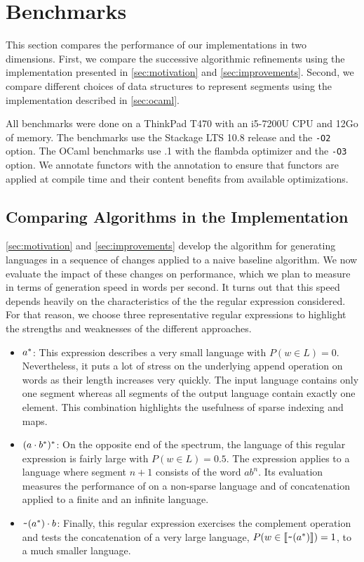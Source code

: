 \section{Benchmarks}
\label{sec:bench}

This section compares the performance of our implementations in two dimensions.
First, we compare the successive algorithmic refinements using the \haskell
implementation presented in \cref{sec:motivation} and \cref{sec:improvements}.
Second, we compare different choices of data structures to represent segments
using the \ocaml implementation described in \cref{sec:ocaml}.

All benchmarks were done on a ThinkPad T470 with an i5-7200U CPU and 12Go of memory.
The \haskell benchmarks use the Stackage LTS 10.8 release and the \texttt{-O2} option.
The OCaml benchmarks use .1 with the flambda optimizer and the
\texttt{-O3} option. We annotate functors
with the \code{[@inline]} annotation to ensure that functors are applied at
compile time and their content benefits from available optimizations.

\subsection{Comparing Algorithms in the \haskell Implementation}

\cref{sec:motivation} and \cref{sec:improvements} develop the
algorithm for generating languages in a sequence of changes applied to
a naive baseline algorithm. We now evaluate the impact of these
changes on performance, which we plan to measure in terms of
generation speed in words per second. It turns out that this speed
depends heavily on the characteristics of the the regular expression
considered. For that reason, we choose three representative regular expressions to highlight the
strengths and weaknesses of the different approaches.
\begin{itemize}
\item $a^*$: This expression describes a very small language with $P (w\in L) = 0$.
  Nevertheless, it puts a lot of stress on the underlying
  append operation on words as their length increases very quickly.
  The input language contains only one segment whereas all segments of
  the output language contain exactly one element. This combination
  highlights the usefulness of sparse indexing and maps.
\item $(a \cdot{b^*})^*$: On the opposite end of the
  spectrum, the language of this regular expression is fairly large
  with $P (w\in L)=0.5$. The expression applies  to a
  language where segment $n+1$ consists of the word $ab^n$. Its
  evaluation measures the performance of  on a non-sparse
  language and of {concatenation} applied to a finite and an infinite
  language.
\item $\texttt{\textasciitilde}{(a^*)} \cdot{b}$: Finally, this regular
  expression exercises the complement operation and tests the
  concatenation of a very large language, 
  $P (w\in \llbracket\texttt{\textasciitilde}{(a^*)}\rrbracket) = 1$, to a much smaller
  language.
\end{itemize}

